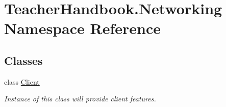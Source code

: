 \hypertarget{namespace_teacher_handbook_1_1_networking}{}\section{Teacher\+Handbook.\+Networking Namespace Reference}
\label{namespace_teacher_handbook_1_1_networking}
\subsection*{Classes}
\begin{DoxyCompactItemize}
\item 
class \mbox{\hyperlink{class_teacher_handbook_1_1_networking_1_1_client}{Client}}
\begin{DoxyCompactList}\small\item\em Instance of this class will provide client features. \end{DoxyCompactList}\end{DoxyCompactItemize}

